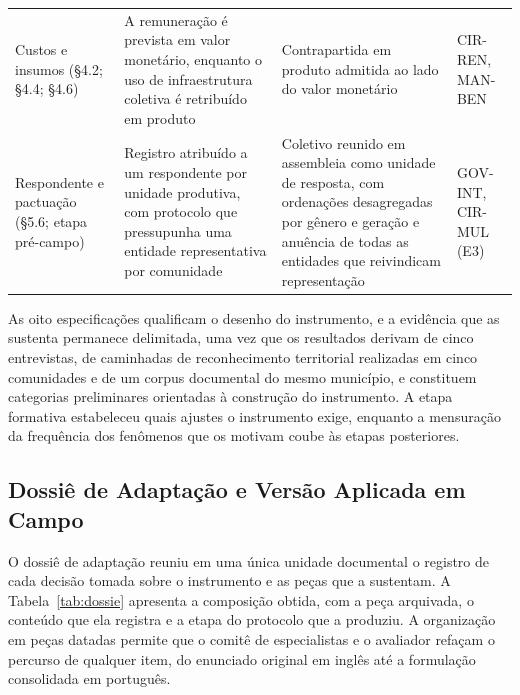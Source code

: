 \documentclass[preprint,authoryear,12pt]{elsarticle}
\begin{document}
\begin{table}[H]
\begin{tabular}{p{2.6cm}p{4.0cm}p{3.7cm}p{2.5cm}}
\addlinespace
Custos e insumos (§4.2; §4.4; §4.6) & A remuneração é prevista em valor monetário, enquanto o uso de infraestrutura coletiva é retribuído em produto & Contrapartida em produto admitida ao lado do valor monetário & CIR-REN, MAN-BEN \\
\addlinespace
Respondente e pactuação (§5.6; etapa pré-campo) & Registro atribuído a um respondente por unidade produtiva, com protocolo que pressupunha uma entidade representativa por comunidade & Coletivo reunido em assembleia como unidade de resposta, com ordenações desagregadas por gênero e geração e anuência de todas as entidades que reivindicam representação & GOV-INT, CIR-MUL (E3) \\
\bottomrule
\end{tabular}
\end{table}

As oito especificações qualificam o desenho do instrumento, e a evidência que as sustenta permanece delimitada, uma vez que os resultados derivam de cinco entrevistas, de caminhadas de reconhecimento territorial realizadas em cinco comunidades e de um corpus documental do mesmo município, e constituem categorias preliminares orientadas à construção do instrumento. A etapa formativa estabeleceu quais ajustes o instrumento exige, enquanto a mensuração da frequência dos fenômenos que os motivam coube às etapas posteriores.


\subsection{Dossiê de Adaptação e Versão Aplicada em Campo}

O dossiê de adaptação reuniu em uma única unidade documental o registro de cada decisão tomada sobre o instrumento e as peças que a sustentam. A Tabela~\ref{tab:dossie} apresenta a composição obtida, com a peça arquivada, o conteúdo que ela registra e a etapa do protocolo que a produziu. A organização em peças datadas permite que o comitê de especialistas e o avaliador refaçam o percurso de qualquer item, do enunciado original em inglês até a formulação consolidada em português.
\end{document}
